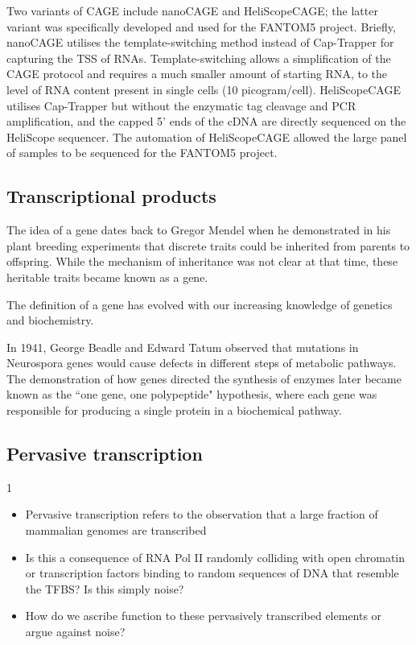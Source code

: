 Two variants of CAGE include nanoCAGE\cite{pmid20543846} and HeliScopeCAGE\cite{pmid21596820}; the latter variant was specifically developed and used for the FANTOM5 project. Briefly, nanoCAGE utilises the template-switching method\cite{pmid11314272} instead of Cap-Trapper for capturing the TSS of RNAs. Template-switching allows a simplification of the CAGE protocol and requires a much smaller amount of starting RNA, to the level of RNA content present in single cells (10 picogram/cell). HeliScopeCAGE utilises Cap-Trapper but without the enzymatic tag cleavage and PCR amplification, and the capped 5' ends of the cDNA are directly sequenced on the HeliScope sequencer. The automation of HeliScopeCAGE\cite{pmid22303458} allowed the large panel of samples to be sequenced for the FANTOM5 project.

\subsection{Transcriptional products}

The idea of a gene dates back to Gregor Mendel when he demonstrated in his plant breeding experiments that discrete traits could be inherited from parents to offspring. While the mechanism of inheritance was not clear at that time, these heritable traits became known as a gene.

The definition of a gene has evolved with our increasing knowledge of genetics and biochemistry\cite{pmid17567988}.

In 1941, George Beadle and Edward Tatum observed that mutations in Neurospora genes would cause defects in different steps of metabolic pathways\cite{Beadle15111941}. The demonstration of how genes directed the synthesis of enzymes later became known as the ``one gene, one polypeptide" hypothesis, where each gene was responsible for producing a single protein in a biochemical pathway.

\subsection{Pervasive transcription}

1%

\begin{itemize}
   \item Pervasive transcription refers to the observation that a large fraction of mammalian genomes are transcribed
   \item Is this a consequence of RNA Pol II randomly colliding with open chromatin or transcription factors binding to random sequences of DNA that resemble the TFBS? Is this simply noise?
   \item How do we ascribe function to these pervasively transcribed elements or argue against noise?
\end{itemize}

